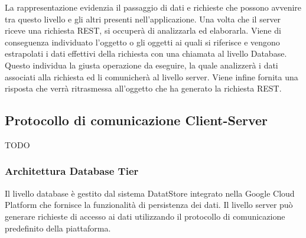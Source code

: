 La rappresentazione evidenzia il passaggio di dati e richieste che possono avvenire tra questo livello e gli altri presenti nell'applicazione.
Una volta che il server riceve una richiesta REST, si occuperà di analizzarla ed elaborarla.
Viene di conseguenza individuato l’oggetto o gli oggetti ai quali si riferisce e vengono estrapolati i dati effettivi della richiesta con una chiamata al livello Database. Questo individua la giusta operazione da eseguire, la quale analizzerà i dati associati alla richiesta ed li comunicherà al livello server. Viene infine fornita una risposta che verrà ritrasmessa all'oggetto che ha generato la richiesta REST.

\subsection{Protocollo di comunicazione Client-Server}
TODO

\subsubsection{Architettura Database Tier}
Il livello database è gestito dal sistema DatatStore integrato nella Google Cloud Platform che fornisce la funzionalità di persistenza dei dati. Il livello server può generare richieste di accesso ai dati utilizzando il protocollo di comunicazione predefinito della piattaforma.



